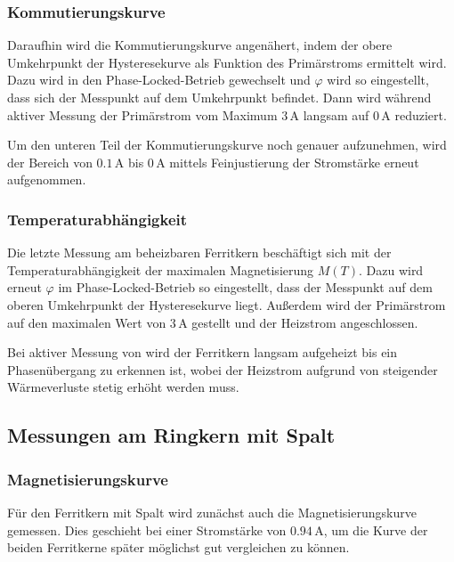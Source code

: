 \documentclass[12pt,a4paper]{scrartcl}
\numberwithin{equation}{section} %
\renewcommand{\[}{} %
\renewcommand{\]}{\noindent} %
\begin{document}
\hypertarget{kommutierungskurve}{%
\subsubsection{Kommutierungskurve}\label{kommutierungskurve}}
Daraufhin wird die Kommutierungskurve angenähert, indem der obere Umkehrpunkt der Hysteresekurve als Funktion des Primärstroms ermittelt wird. Dazu wird in den Phase-Locked-Betrieb gewechselt und \(\varphi\) wird so eingestellt, dass sich der Messpunkt auf dem Umkehrpunkt befindet. Dann wird während aktiver Messung der Primärstrom vom Maximum \(3\,\mathrm A\) langsam auf \(0\,\mathrm A\) reduziert.

Um den unteren Teil der Kommutierungskurve noch genauer aufzunehmen, wird der Bereich von \(0.1\,\mathrm A\) bis \(0\,\mathrm A\) mittels Feinjustierung der Stromstärke erneut aufgenommen.

\hypertarget{temperaturabhuxe4ngigkeit}{%
\subsubsection{Temperaturabhängigkeit}\label{temperaturabhuxe4ngigkeit}}
Die letzte Messung am beheizbaren Ferritkern beschäftigt sich mit der Temperaturabhängigkeit der maximalen Magnetisierung \(M(T)\). Dazu wird erneut \(\varphi\) im Phase-Locked-Betrieb so eingestellt, dass der Messpunkt auf dem oberen Umkehrpunkt der Hysteresekurve liegt. Außerdem wird der Primärstrom auf den maximalen Wert von \(3\,\mathrm A\) gestellt und der Heizstrom angeschlossen.

Bei aktiver Messung von wird der Ferritkern langsam aufgeheizt bis ein Phasenübergang zu erkennen ist, wobei der Heizstrom aufgrund von steigender Wärmeverluste stetig erhöht werden muss.

\hypertarget{messungen-am-ringkern-mit-spalt}{%
\subsection{Messungen am Ringkern mit Spalt}\label{messungen-am-ringkern-mit-spalt}}

\hypertarget{magnetisierungskurve-1}{%
\subsubsection{Magnetisierungskurve}\label{magnetisierungskurve-1}}

Für den Ferritkern mit Spalt wird zunächst auch die Magnetisierungskurve gemessen. Dies geschieht bei einer Stromstärke von \(0.94\,\mathrm A\), um die Kurve der beiden Ferritkerne später möglichst gut vergleichen zu können.
\end{document}
